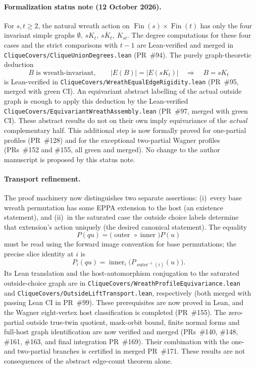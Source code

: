\documentclass[11pt,a4paper]{article}
\begin{document}
\paragraph{Formalization status note (12 October 2026).}
For \(s,t\ge2\), the natural wreath action on
\(\operatorname{Fin}(s)\times\operatorname{Fin}(t)\) has only the
four invariant simple graphs
\(\emptyset,\ sK_t,\ \overline{sK_t},\ K_{st}\).
The degree computations for these four cases and the strict
comparisons with \(t-1\) are Lean-verified and merged
in \texttt{CliqueCovers/CliqueUnionDegrees.lean}
(PR~\#94). The purely graph-theoretic deduction
\[
  B\text{ is wreath-invariant},\qquad
  |E(B)|=|E(sK_t)|
  \quad\Longrightarrow\quad B=sK_t
\]
is Lean-verified in
\texttt{CliqueCovers/WreathEqualEdgeRigidity.lean}
(PR~\#95, merged with green CI). An equivariant abstract
labelling of the actual outside graph is enough to apply
this deduction by the Lean-verified
\texttt{CliqueCovers/EquivariantWreathAssembly.lean}
(PR~\#97, merged with green CI).
These abstract results do not on their own imply equivariance
of the \emph{actual} complementary half. This additional step is
now formally proved for one-partial profiles (PR~\#128)
and for the exceptional two-partial Wagner profiles
(PRs~\#152 and \#155, all green and merged).
No change to the author manuscript is proposed by this
status note.


\paragraph{Transport refinement.}
The proof machinery now distinguishes two separate assertions:
(i)~every base wreath permutation has some EPPA extension to the
host (an existence statement), and
(ii)~in the saturated case the outside choice labels determine
that extension's action uniquely (the desired canonical statement).
The equality
\[
  P(q u)=
    \bigl(\operatorname{outer}\,\circ
    \operatorname{inner}\bigr)P(u)
\]
must be read using the forward image convention for base
permutations; the precise slice identity at \(i\) is
\[
  P_i(q u)=\operatorname{inner}_i
     \bigl(P_{\operatorname{outer}^{-1}(i)}(u)\bigr).
\]
Its Lean translation and the host-automorphism conjugation to
the saturated outside-choice graph are in
\texttt{CliqueCovers/WreathProfileEquivariance.lean} and
\texttt{CliqueCovers/OutsideLiftTransport.lean},
respectively (both merged with passing Lean CI in PR~\#99).
These prerequisites are now proved in Lean, and the Wagner
eight-vertex host classification is completed (PR~\#155).
The zero-partial outside true-twin quotient, mask-orbit bound,
finite normal forms and full-host graph identification are now
verified and merged (PRs~\#140, \#148, \#161, \#163,
and final integration PR~\#169). Their combination with the
one- and two-partial branches is certified in merged PR~\#171.
These results are not consequences of the abstract
edge-count theorem alone.
\end{document}
